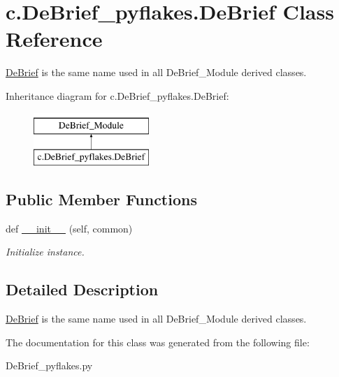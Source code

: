 \hypertarget{classc_1_1_de_brief__pyflakes_1_1_de_brief}{}\section{c.\+De\+Brief\+\_\+pyflakes.\+De\+Brief Class Reference}
\label{classc_1_1_de_brief__pyflakes_1_1_de_brief}


\hyperlink{classc_1_1_de_brief__pyflakes_1_1_de_brief}{De\+Brief} is the same name used in all De\+Brief\+\_\+\+Module derived classes.  


Inheritance diagram for c.\+De\+Brief\+\_\+pyflakes.\+De\+Brief\+:\begin{figure}[H]
\begin{center}
\leavevmode
\includegraphics[height=2.000000cm]{classc_1_1_de_brief__pyflakes_1_1_de_brief}
\end{center}
\end{figure}
\subsection*{Public Member Functions}
\begin{DoxyCompactItemize}
\item 
\hypertarget{classc_1_1_de_brief__pyflakes_1_1_de_brief_ade1ca801baf2dbc184c04573780d63d7}{}def \hyperlink{classc_1_1_de_brief__pyflakes_1_1_de_brief_ade1ca801baf2dbc184c04573780d63d7}{\+\_\+\+\_\+init\+\_\+\+\_\+} (self, common)\label{classc_1_1_de_brief__pyflakes_1_1_de_brief_ade1ca801baf2dbc184c04573780d63d7}

\begin{DoxyCompactList}\small\item\em Initialize instance. \end{DoxyCompactList}\end{DoxyCompactItemize}


\subsection{Detailed Description}
\hyperlink{classc_1_1_de_brief__pyflakes_1_1_de_brief}{De\+Brief} is the same name used in all De\+Brief\+\_\+\+Module derived classes. 



The documentation for this class was generated from the following file\+:\begin{DoxyCompactItemize}
\item 
De\+Brief\+\_\+pyflakes.\+py\end{DoxyCompactItemize}
